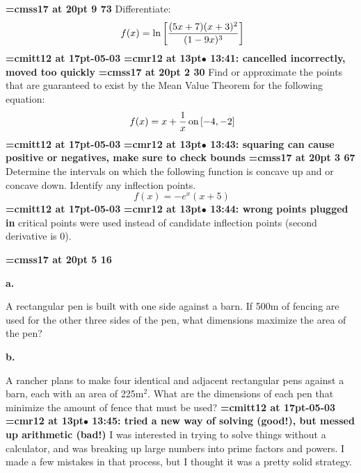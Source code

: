 {\medskip\noindent\bf\font\titlefont=cmss17 at 20pt 9 73}\medskip
Differentiate:
$$\
f(x) = \ln \bigg[{
(5x + 7)(x + 3)^2
\over
(1 - 9x)^3
}
\bigg]
$$
{\medskip\noindent\bf\font\titlefont=cmitt12 at 17pt-05-03}\medskip
{\smallskip\noindent\bf\font\titlefont=cmr12 at 13pt\titlefont $\bullet$ 13:41: cancelled incorrectly, moved too quickly}\smallskip
\xrdef{node133}
{\medskip\noindent\bf\font\titlefont=cmss17 at 20pt 2 30}\medskip
Find or approximate the points that are guaranteed to exist
by the Mean Value Theorem for the following equation:
$$\
f(x) = x + {1 \over x} \, \hbox{on} \, [-4, -2]
$$
{\medskip\noindent\bf\font\titlefont=cmitt12 at 17pt-05-03}\medskip
{\smallskip\noindent\bf\font\titlefont=cmr12 at 13pt\titlefont $\bullet$ 13:43: squaring can cause positive or negatives, make sure to check bounds}\smallskip
\xrdef{node134}
{\medskip\noindent\bf\font\titlefont=cmss17 at 20pt\titlefont 4 3 67}\medskip
Determine the intervals on which the following function is
concave up and or concave down. Identify any inflection points.
$$\
f(x) = -e^{x}(x+5)
$$
{\medskip\noindent\bf\font\titlefont=cmitt12 at 17pt-05-03}\medskip
{\smallskip\noindent\bf\font\titlefont=cmr12 at 13pt\titlefont $\bullet$ 13:44: wrong points plugged in}\smallskip
critical points were used instead of candidate inflection points (second derivative is 0).
\par

\xrdef{node135}
{\medskip\noindent\bf\font\titlefont=cmss17 at 20pt 5 16}\medskip
{\par \bf a.}
A rectangular pen is built with one side against
a barn. If 500m of fencing are used for the other three sides
of the pen, what dimensions maximize the area of the pen?
{\par \bf b.}
A rancher plans to make four identical and adjacent rectangular pens
against a barn, each with an area of 225m$^2$. What are the dimensions
of each pen that minimize the amount of fence that must be used?
{\medskip\noindent\bf\font\titlefont=cmitt12 at 17pt\titlefont 2026-05-03}\medskip
{\smallskip\noindent\bf\font\titlefont=cmr12 at 13pt\titlefont $\bullet$ 13:45: tried a new way of solving (good!), but messed up arithmetic (bad!)}\smallskip
I was interested in trying to solve things without a calculator, and was breaking up large numbers into prime factors and powers. I made a few mistakes in that process, but I thought it was a pretty solid strategy.
\par

